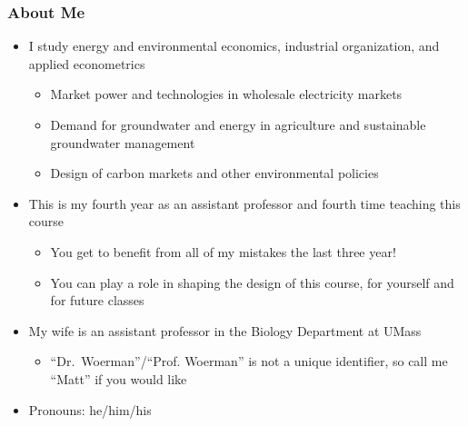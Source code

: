 \documentclass{beamer}
\begin{document}
\begin{frame}\frametitle{About Me}
    \begin{itemize}
        \item I study energy and environmental economics, industrial organization, and applied econometrics
        \begin{itemize}
            \item Market power and technologies in wholesale electricity markets
            \item Demand for groundwater and energy in agriculture and sustainable groundwater management
            \item Design of carbon markets and other environmental policies
        \end{itemize}
        \item This is my fourth year as an assistant professor and fourth time teaching this course
        \begin{itemize}
            \item You get to benefit from all of my mistakes the last three year!
            \item You can play a role in shaping the design of this course, for yourself and for future classes
        \end{itemize}
        \item My wife is an assistant professor in the Biology Department at UMass
        \begin{itemize}
            \item ``Dr.\ Woerman''/``Prof. Woerman'' is not a unique identifier, so call me ``Matt'' if you would like
        \end{itemize}
        \item Pronouns: he/him/his
    \end{itemize}
\end{frame}

\end{document}
